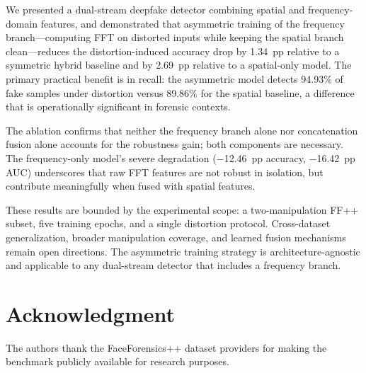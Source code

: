\documentclass[conference]{IEEEtran}
\begin{document}
We presented a dual-stream deepfake detector combining spatial and
frequency-domain features, and demonstrated that asymmetric training
of the frequency branch---computing FFT on distorted inputs while
keeping the spatial branch clean---reduces the distortion-induced
accuracy drop by 1.34~pp relative to a symmetric hybrid baseline and
by 2.69~pp relative to a spatial-only model. The primary practical
benefit is in recall: the asymmetric model detects 94.93\% of fake
samples under distortion versus 89.86\% for the spatial baseline, a
difference that is operationally significant in forensic contexts.

The ablation confirms that neither the frequency branch alone nor
concatenation fusion alone accounts for the robustness gain; both
components are necessary. The frequency-only model's severe degradation
($-$12.46~pp accuracy, $-$16.42~pp AUC) underscores that raw FFT
features are not robust in isolation, but contribute meaningfully when
fused with spatial features.

These results are bounded by the experimental scope: a two-manipulation
FF++ subset, five training epochs, and a single distortion protocol.
Cross-dataset generalization, broader manipulation coverage, and
learned fusion mechanisms remain open directions. The asymmetric
training strategy is architecture-agnostic and applicable to any
dual-stream detector that includes a frequency branch.

\section*{Acknowledgment}

The authors thank the FaceForensics++ dataset providers for making
the benchmark publicly available for research purposes.
\end{document}
